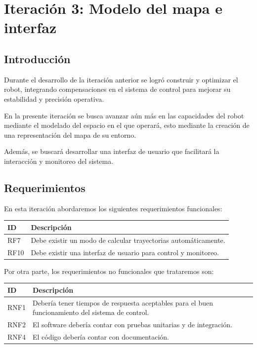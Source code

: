 \newpage
\section{Iteración 3: Modelo del mapa e interfaz}

\subsection{Introducción}
Durante el desarrollo de la iteración anterior se logró construir y optimizar el robot, integrando compensaciones en el sistema de control para mejorar su estabilidad y precisión operativa.

En la presente iteración se busca avanzar aún más en las capacidades del robot mediante el modelado del espacio en el que operará, esto mediante la creación de una representación del mapa de su entorno.

Además, se buscará desarrollar una interfaz de usuario que facilitará la interacción y monitoreo del sistema.

\subsection{Requerimientos}
En esta iteración abordaremos los siguientes requerimientos funcionales:

\begin{center}
\begin{tabular}{
    | >{\centering\arraybackslash}m{1cm}
    | >{\centering\arraybackslash}m{13cm} |
}
\hline \rowcolor{test_header_color}
    ID & Descripción \\
\hline
    RF7 & Debe existir un modo de calcular trayectorias automáticamente. \\
\hline
    RF10 & Debe existir una interfaz de usuario para control y monitoreo. \\
\hline
\end{tabular}
\end{center}

Por otra parte, los requerimientos no funcionales que trataremos son:

\begin{center}
\begin{tabular}{
    | >{\centering\arraybackslash}m{1cm}
    | >{\centering\arraybackslash}m{13cm} |
}
\hline \rowcolor{test_header_color}
    ID & Descripción \\
\hline
    RNF1 & Debería tener tiempos de respuesta aceptables para el buen funcionamiento del sistema de control. \\
\hline
    RNF2 & El software debería contar con pruebas unitarias y de integración. \\
\hline
    RNF4 & El código debería contar con documentación.\\
\hline
\end{tabular}
\end{center}


